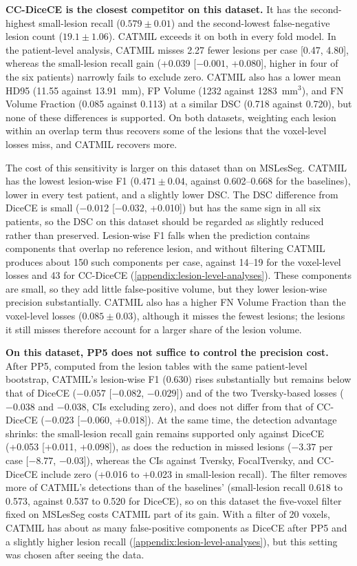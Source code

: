 \textbf{CC-DiceCE is the closest competitor on this dataset.} It has the
second-highest small-lesion recall ($0.579 \pm 0.01$) and the second-lowest
false-negative lesion count ($19.1 \pm 1.06$). CATMIL exceeds it on both in
every fold model. In the patient-level analysis, CATMIL misses 2.27 fewer
lesions per case [0.47, 4.80], whereas the small-lesion recall gain
(+0.039 [$-0.001$, +0.080], higher in four of the six patients) narrowly
fails to exclude zero. CATMIL also has a lower mean HD95 (11.55 against
13.91~mm), FP Volume (1232 against 1283~mm$^3$), and FN Volume Fraction
(0.085 against 0.113) at a similar DSC (0.718 against 0.720), but none of
these differences is supported. On both datasets, weighting each lesion
within an overlap term thus recovers some of the lesions that the
voxel-level losses miss, and CATMIL recovers more.

The cost of this sensitivity is larger on this dataset than on MSLesSeg.
CATMIL has the lowest lesion-wise F1 ($0.471 \pm 0.04$, against
0.602--0.668 for the baselines), lower in every test patient, and a
slightly lower DSC. The DSC difference from DiceCE is small
($-0.012$ [$-0.032$, +0.010]) but has the same sign in all six patients,
so the DSC on this dataset should be regarded as slightly reduced rather
than preserved. Lesion-wise F1
falls when the prediction contains components that overlap no reference
lesion, and without filtering CATMIL produces about 150 such components per
case, against 14--19 for the voxel-level losses and 43 for CC-DiceCE
(\cref{appendix:lesion-level-analyses}). These components are small, so
they add little false-positive volume, but they lower lesion-wise
precision substantially. CATMIL also has a higher FN Volume Fraction than
the voxel-level losses ($0.085 \pm 0.03$), although it misses the fewest
lesions; the lesions it still misses therefore account for a larger share
of the lesion volume.

\textbf{On this dataset, PP5 does not suffice to control the precision
cost.} After PP5, computed from the lesion tables with the same
patient-level bootstrap, CATMIL's lesion-wise F1 (0.630) rises
substantially but remains below that of DiceCE ($-0.057$ [$-0.082$,
$-0.029$]) and of the two Tversky-based losses ($-0.038$ and $-0.038$, CIs
excluding zero), and does not differ from that of CC-DiceCE ($-0.023$
[$-0.060$, +0.018]). At the same time, the detection advantage shrinks:
the small-lesion recall gain remains supported only against DiceCE (+0.053
[+0.011, +0.098]), as does the reduction in missed lesions ($-3.37$ per
case [$-8.77$, $-0.03$]), whereas the CIs against Tversky, FocalTversky,
and CC-DiceCE include zero (+0.016 to +0.023 in small-lesion recall). The
filter removes more of CATMIL's detections than of the baselines'
(small-lesion recall 0.618 to 0.573, against 0.537 to 0.520 for DiceCE),
so on this dataset the five-voxel filter fixed on MSLesSeg costs CATMIL
part of its gain. With a filter of 20 voxels, CATMIL has about as many
false-positive components as DiceCE after PP5 and a slightly higher lesion
recall (\cref{appendix:lesion-level-analyses}), but this setting was chosen
after seeing the data.

